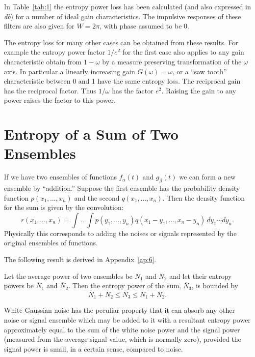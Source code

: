 In Table~\ref{tab:1} the entropy power loss has been calculated (and also
expressed in {\it db}) for a number of ideal gain characteristics.  The
impulsive responses of these filters are also given for $W=2\pi$, with
phase assumed to be $0$.

The entropy loss for many other cases can be obtained from these results.
For example the entropy power factor $1/e^2$ for the
first case also applies to any gain characteristic obtain from $1-\omega$
by a measure preserving transformation of the $\omega$ axis.  In particular
a linearly increasing gain $G(\omega)=\omega$, or a ``saw tooth''
characteristic between 0 and 1 have the same entropy loss.  The reciprocal
gain has the reciprocal factor.  Thus $1/\omega$ has the
factor $e^2$.  Raising the gain to any power raises the factor to this power.

\section{Entropy of a Sum of Two  Ensembles}

If we have two ensembles of functions $f_\alpha(t)$ and $g_\beta(t)$ we can
form a new ensemble by ``addition.''  Suppose the first ensemble has the
probability density function $p(x_1,\dots,x_n)$ and the second
$q(x_1,\dots,x_n)$.  Then the density function for the sum is given by the
convolution:
$$
r(x_1,\dots,x_n)=\int\dots\int p(y_1,\dots,y_n) %
q(x_1-y_1,\dots,x_n-y_n)\,dy_1\dotsm dy_n.
$$
Physically this corresponds to adding the noises or signals represented by
the original ensembles of functions.

The following result is derived in Appendix~\ref{ap:6}.
\begin{theorem}
\label{thm:15}
Let the average power of two ensembles be $N_1$ and $N_2$ and let their
entropy powers be $\overline N_1$ and $\overline N_2$.  Then the entropy
power of the sum, $\overline N_3$, is bounded by
$$
\overline N_1+\overline N_2\leq\overline N_3\leq N_1+N_2.
$$
\end{theorem}

White Gaussian noise has the peculiar property that it can absorb any other
noise or signal ensemble which may be added to it with a resultant entropy
power approximately equal to the sum of the white noise power and the signal
power (measured from the average signal value, which is normally zero),
provided the signal power is small, in a certain sense, compared to noise.

